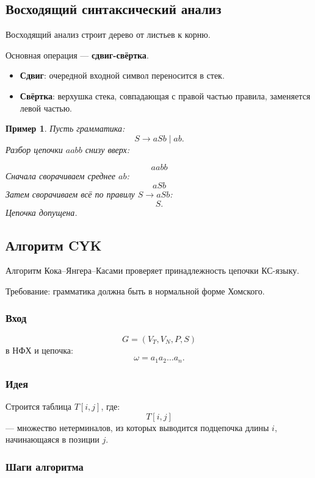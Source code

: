 \documentclass[12pt,a4paper]{article}
\newtheorem{example}{Пример}
\begin{document}
\subsection{Восходящий синтаксический анализ}

Восходящий анализ строит дерево от листьев к корню.

Основная операция --- \textbf{сдвиг-свёртка}.

\begin{itemize}
    \item \textbf{Сдвиг}: очередной входной символ переносится в стек.
    \item \textbf{Свёртка}: верхушка стека, совпадающая с правой частью правила, заменяется левой частью.
\end{itemize}

\begin{example}
Пусть грамматика:
\[
S\to aSb\mid ab.
\]
Разбор цепочки $aabb$ снизу вверх:

\[
aabb
\]
Сначала сворачиваем среднее $ab$:
\[
aSb
\]
Затем сворачиваем всё по правилу $S\to aSb$:
\[
S.
\]
Цепочка допущена.
\end{example}

\subsection{Алгоритм CYK}

Алгоритм Кока--Янгера--Касами проверяет принадлежность цепочки КС-языку.

Требование: грамматика должна быть в нормальной форме Хомского.

\subsubsection*{Вход}

\[
G=(V_T,V_N,P,S)
\]
в НФХ и цепочка:
\[
\omega=a_1a_2\ldots a_n.
\]

\subsubsection*{Идея}

Строится таблица $T[i,j]$, где:
\[
T[i,j]
\]
--- множество нетерминалов, из которых выводится подцепочка длины $i$, начинающаяся в позиции $j$.

\subsubsection*{Шаги алгоритма}
\end{document}
